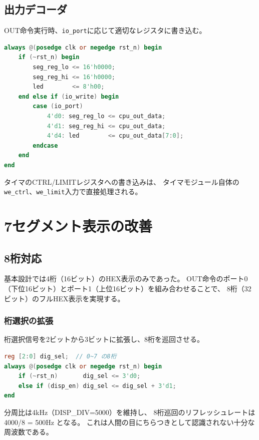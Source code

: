 \documentclass[a4paper,11pt]{ltjsarticle}
\begin{document}
\subsection{出力デコーダ}

OUT命令実行時、\texttt{io\_port}に応じて適切なレジスタに書き込む。

\begin{lstlisting}[language=Verilog,caption={I/O出力デコーダ}]
always @(posedge clk or negedge rst_n) begin
    if (~rst_n) begin
        seg_reg_lo <= 16'h0000;
        seg_reg_hi <= 16'h0000;
        led        <= 8'h00;
    end else if (io_write) begin
        case (io_port)
            4'd0: seg_reg_lo <= cpu_out_data;
            4'd1: seg_reg_hi <= cpu_out_data;
            4'd4: led        <= cpu_out_data[7:0];
        endcase
    end
end
\end{lstlisting}

タイマのCTRL/LIMITレジスタへの書き込みは、
タイマモジュール自体の\texttt{we\_ctrl}、\texttt{we\_limit}入力で直接処理される。


\section{7セグメント表示の改善}

\subsection{8桁対応}

基本設計では4桁（16ビット）のHEX表示のみであった。
OUT命令のポート0（下位16ビット）とポート1（上位16ビット）を組み合わせることで、
8桁（32ビット）のフルHEX表示を実現する。

\subsubsection{桁選択の拡張}

桁選択信号を2ビットから3ビットに拡張し、8桁を巡回させる。

\begin{lstlisting}[language=Verilog,caption={8桁ダイナミック点灯}]
reg [2:0] dig_sel;  // 0~7 の8桁
always @(posedge clk or negedge rst_n) begin
    if (~rst_n)       dig_sel <= 3'd0;
    else if (disp_en) dig_sel <= dig_sel + 3'd1;
end
\end{lstlisting}

分周比は4kHz（DISP\_DIV=5000）を維持し、
8桁巡回のリフレッシュレートは 4000/8 = 500Hz となる。
これは人間の目にちらつきとして認識されない十分な周波数である。
\end{document}
